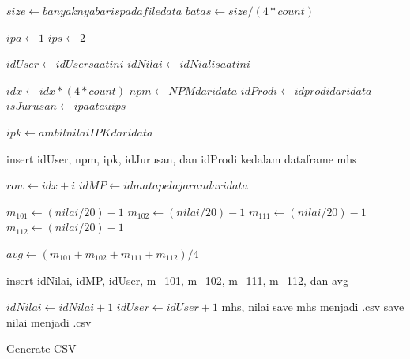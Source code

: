 \begin{algorithm}[H]
  \begin{algorithmic}[1]
        \State $size \gets banyaknya baris pada file data$
        \State $batas \gets size/(4*count)$ 
        
        \State $ipa \gets 1$ 
        \State $ips \gets 2$ 
        
        \State $idUser \gets idUser saat ini$
        \State $idNilai \gets idNiali saat ini$
        
            \State $idx \gets idx*(4*count)$
            \State $npm \gets NPM dari data$
            \State $idProdi \gets id prodi dari data$
            \State $isJurusan \gets ipa atau ips$ 
            
                \State $ipk \gets ambil nilai IPK dari data$ 
            \EndFor
            
            \State insert idUser, npm, ipk, idJurusan, dan idProdi kedalam dataframe mhs
            
                \State $row \gets idx+i$
                \State $idMP \gets id mata pelajaran dari data$
                
                \State $m_101 \gets (nilai/20)-1$ 
                \State $m_102 \gets (nilai/20)-1$ 
                \State $m_111 \gets (nilai/20)-1$ 
                \State $m_112 \gets (nilai/20)-1$ 
                
                \State $avg \gets (m_101+m_102+m_111+m_112)/4$
                
                \State insert idNilai, idMP, idUser, m\_101, m\_102, m\_111, m\_112, dan avg
                
                \State $idNilai \gets idNilai+1$
            \EndFor
            \State $idUser \gets idUser+1$
        \EndFor
        \State \Return mhs, nilai
    \EndProcedure
    \State save mhs menjadi .csv
    \State save nilai menjadi .csv
  \end{algorithmic} 
  \caption{Generate CSV}
  \label{alg:generateCSV}
\end{algorithm}

